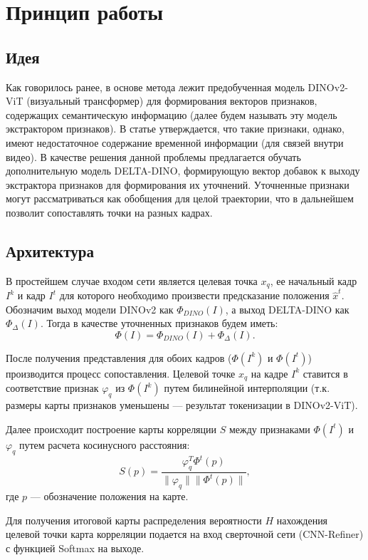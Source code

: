 \documentclass[a4paper, 14pt]{extarticle}
\theoremstyle{definition}
\theoremstyle{plain}
\theoremstyle{remark}
\begin{document}
\newpage

\section{Принцип работы}
\subsection{Идея}
Как говорилось ранее, в основе метода лежит предобученная модель DINOv2-ViT (визуальный трансформер) для формирования векторов признаков, содержащих семантическую информацию (далее будем называть эту модель экстрактором признаков). 
В статье утверждается, что такие признаки, однако, имеют недостаточное содержание временной информации (для связей внутри видео). В качестве решения данной проблемы предлагается обучать дополнительную модель DELTA-DINO, формирующую вектор добавок к выходу экстрактора признаков для формирования их уточнений. Уточненные признаки могут рассматриваться как обобщения для целой траектории, что в дальнейшем позволит сопоставлять точки на разных кадрах.

\subsection{Архитектура}
В простейшем случае входом сети является целевая точка $x_q$, ее начальный кадр $I^k$ и кадр $I^t$ для которого необходимо произвести предсказание положения $\hat{x}^t$. Обозначим выход модели DINOv2 как $\Phi_{DINO}(I)$, а выход DELTA-DINO как $\Phi_{\Delta}(I)$. Тогда в качестве уточненных признаков будем иметь:
\begin{equation}
	\Phi(I) = \Phi_{DINO}(I) + \Phi_{\Delta}(I).
\end{equation}

После получения представления для обоих кадров ($\Phi(I^k)$ и $\Phi(I^t)$) производится процесс сопоставления. Целевой точке $x_q$ на кадре $I^k$ ставится в соответствие признак $\varphi_q$ из $\Phi(I^k)$ путем билинейной интерполяции (т.к. размеры карты признаков уменьшены --- результат токенизации в DINOv2-ViT).

Далее происходит построение карты корреляции $S$ между признаками $\Phi(I^t)$ и $\varphi_q$ путем расчета косинусного расстояния:
\begin{equation}
	S(p) = \frac{\varphi_q^T \Phi^t(p)}{\|\varphi_q\|\|\Phi^t(p)\|},
\end{equation}
где $p$ --- обозначение положения на карте.

Для получения итоговой карты распределения вероятности $H$ нахождения целевой точки карта корреляции подается на вход сверточной сети (CNN-Refiner) с функцией Softmax на выходе.
\end{document}
